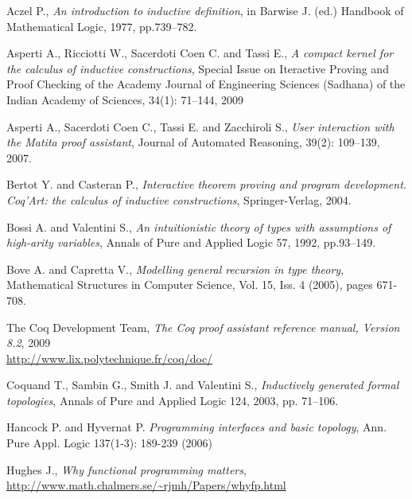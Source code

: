 \documentclass[copyright,creativecommons]{eptcs}
\begin{document}

\begin{thebibliography}{1}

Aczel P.,
{\em An introduction to inductive definition},
in Barwise J. (ed.) Handbook of Mathematical Logic, 1977, pp.739--782.





Asperti A., Ricciotti W., Sacerdoti Coen C. and Tassi E.,
{\em A compact kernel for the calculus of inductive constructions},
Special Issue on Iteractive Proving and Proof Checking of the Academy Journal of 
Engineering Sciences (Sadhana) of the Indian Academy of Sciences, 34(1): 71--144, 2009 

Asperti A., Sacerdoti Coen C., Tassi E. and Zacchiroli S.,
{\em User interaction with the Matita proof assistant},
Journal of Automated Reasoning, 39(2): 109--139, 2007.

Bertot Y.  and Casteran P.,
{\em Interactive theorem proving and program development. Coq'Art: the calculus of inductive constructions},
Springer-Verlag, 2004.

Bossi A. and Valentini S.,
{\em An intuitionistic theory of types with assumptions of high-arity variables},
Annals of Pure and Applied Logic 57, 1992, pp.93--149.

Bove A. and Capretta V.,
{\em Modelling general recursion in type theory},
Mathematical Structures in Computer Science, Vol. 15, Iss. 4 (2005), pages 671-708.

The Coq Development Team,
{\em The Coq proof assistant reference manual, Version 8.2}, 2009\\
\url{http://www.lix.polytechnique.fr/coq/doc/}

Coquand T., Sambin G., Smith J. and Valentini S.,
{\em Inductively generated formal topologies},
Annals of Pure and Applied Logic 124, 2003, pp. 71--106.

Hancock P. and Hyvernat P. 
{\em Programming interfaces and basic topology}, 
Ann. Pure Appl. Logic 137(1-3): 189-239 (2006)





Hughes  J.,
{\em Why functional programming matters},\\
\url{http://www.math.chalmers.se/~rjmh/Papers/whyfp.html}


\end{thebibliography}
\end{document}
